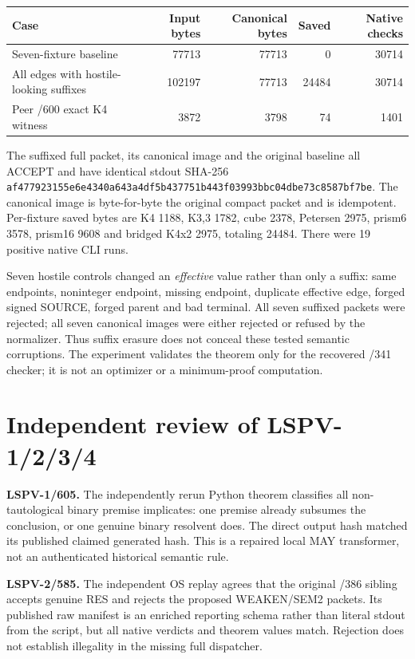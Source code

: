 \documentclass[11pt]{article}
\begin{document}
\begin{center}
\begin{tabular}{lrrrr}
\toprule
Case & Input bytes & Canonical bytes & Saved & Native checks\\
\midrule
Seven-fixture baseline & 77713 & 77713 & 0 & 30714\\
All edges with hostile-looking suffixes & 102197 & 77713 & 24484 & 30714\\
Peer /600 exact K4 witness & 3872 & 3798 & 74 & 1401\\
\bottomrule
\end{tabular}
\end{center}

The suffixed full packet, its canonical image and the original baseline all ACCEPT and have identical
stdout SHA-256
\texttt{af477923155e6e4340a643a4df5b437751b443f03993bbc04dbe73c8587bf7be}.
The canonical image is byte-for-byte the original compact packet and is idempotent.  Per-fixture saved
bytes are K4 1188, K3,3 1782, cube 2378, Petersen 2975, prism6 3578, prism16 9608 and bridged K4x2
2975, totaling 24484.  There were 19 positive native CLI runs.

Seven hostile controls changed an \emph{effective} value rather than only a suffix: same endpoints,
noninteger endpoint, missing endpoint, duplicate effective edge, forged signed SOURCE, forged parent and
bad terminal.  All seven suffixed packets were rejected; all seven canonical images were either rejected
or refused by the normalizer.  Thus suffix erasure does not conceal these tested semantic corruptions.
The experiment validates the theorem only for the recovered /341 checker; it is not an optimizer or a
minimum-proof computation.

\section*{Independent review of LSPV-1/2/3/4}

\textbf{LSPV-1/605.}  The independently rerun Python theorem classifies all non-tautological binary
premise implicates: one premise already subsumes the conclusion, or one genuine binary resolvent does.
The direct output hash matched its published claimed generated hash.  This is a repaired local MAY
transformer, not an authenticated historical semantic rule.

\textbf{LSPV-2/585.}  The independent OS replay agrees that the original /386 sibling accepts genuine
RES and rejects the proposed WEAKEN/SEM2 packets.  Its published raw manifest is an enriched reporting
schema rather than literal stdout from the script, but all native verdicts and theorem values match.
Rejection does not establish illegality in the missing full dispatcher.
\end{document}
